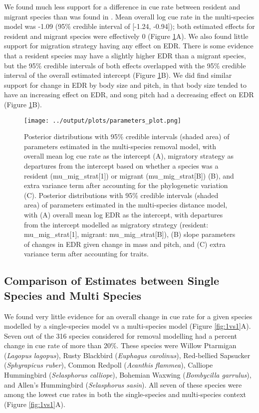 \documentclass[12pt]{article}
\begin{document}
\par We found much less support for a difference in cue rate between resident and migrant species than was found in \citet{solymos_evaluating_2018}. 
Mean overall log cue rate in the multi-species model was -1.09 (95\% credible interval of [-1.24, -0.94]); both estimated effects for resident and migrant species were effectively 0 (Figure \ref{fig:params}A).
We also found little support for migration strategy having any effect on EDR.
There is some evidence that a resident species may have a slightly higher EDR than a migrant species, but the 95\% credible intervals of both effects overlapped with the 95\% credible interval of the overall estimated intercept (Figure \ref{fig:params}B).
We did find similar support for change in EDR by body size and pitch, in that body size tended to have an increasing effect on EDR, and song pitch had a decreasing effect on EDR (Figure \ref{fig:params}B).

\begin{figure}[h!]
	\texttt{[image: ../output/plots/parameters\_plot.png]}
	\caption{Posterior distributions with 95\% credible intervals (shaded area) of parameters estimated in the multi-species removal model, with overall mean log cue rate as the intercept (A), migratory strategy as departures from the intercept based on whether a species was a resident (mu\_mig\_strat[1]) or migrant (mu\_mig\_strat[B]) (B), and extra variance term after accounting for the phylogenetic variation (C). Posterior distributions with 95\% credible intervals (shaded area) of parameters estimated in the multi-species distance model, with (A) overall mean log EDR as the intercept, with departures from the intercept modelled as migratory strategy (resident: mu\_mig\_strat[1], migrant: mu\_mig\_strat[B]), (B) slope parameters of changes in EDR given change in mass and pitch, and (C) extra variance term after accounting for traits.}
	\label{fig:params}
\end{figure}

\subsection{Comparison of Estimates between Single Species and Multi Species}

\par We found very little evidence for an overall change in cue rate for a given species modelled by a single-species model vs a multi-species model (Figure \ref{fig:1vs1}A).
Seven out of the 316 species considered for removal modelling had a percent change in cue rate of more than 20\%.
These species were Willow Ptarmigan (\textit{Lagopus lagopus}), Rusty Blackbird (\textit{Euphagus carolinus}), Red-bellied Sapsucker (\textit{Sphyrapicus ruber}), Common Redpoll (\textit{Acanthis flammea}), Calliope Hummingbird (\textit{Selasphorus calliope}), Bohemian Waxwing (\textit{Bombycilla garrulus}), and Allen's Hummingbird (\textit{Selasphorus sasin}).
All seven of these species were among the lowest cue rates in both the single-species and multi-species context (Figure \ref{fig:1vs1}A).
\end{document}

